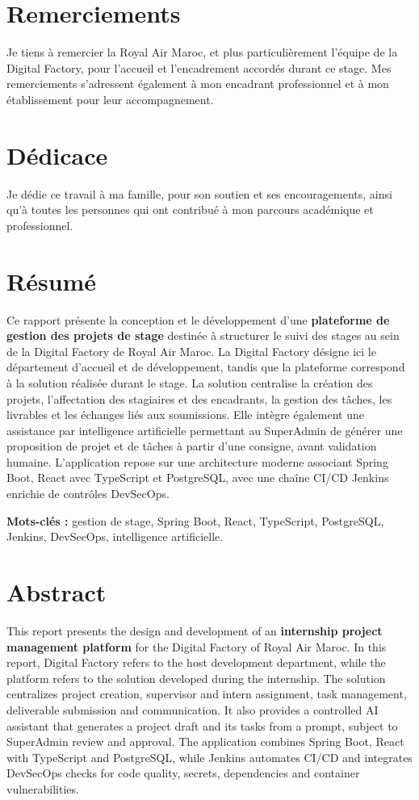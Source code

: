 \documentclass[11pt,a4paper,oneside]{report}
\begin{document}
\chapter*{Remerciements}
Je tiens à remercier la Royal Air Maroc, et plus particulièrement l'équipe de la Digital Factory, pour l'accueil et l'encadrement accordés durant ce stage. Mes remerciements s'adressent également à mon encadrant professionnel et à mon établissement pour leur accompagnement.

\chapter*{Dédicace}
Je dédie ce travail à ma famille, pour son soutien et ses encouragements, ainsi qu'à toutes les personnes qui ont contribué à mon parcours académique et professionnel.

\chapter*{Résumé}
Ce rapport présente la conception et le développement d'une \textbf{plateforme de gestion des projets de stage} destinée à structurer le suivi des stages au sein de la Digital Factory de Royal Air Maroc. La Digital Factory désigne ici le département d'accueil et de développement, tandis que la plateforme correspond à la solution réalisée durant le stage. La solution centralise la création des projets, l'affectation des stagiaires et des encadrants, la gestion des tâches, les livrables et les échanges liés aux soumissions. Elle intègre également une assistance par intelligence artificielle permettant au SuperAdmin de générer une proposition de projet et de tâches à partir d'une consigne, avant validation humaine. L'application repose sur une architecture moderne associant Spring Boot, React avec TypeScript et PostgreSQL, avec une chaîne CI/CD Jenkins enrichie de contrôles DevSecOps.

\noindent\textbf{Mots-clés :} gestion de stage, Spring Boot, React, TypeScript, PostgreSQL, Jenkins, DevSecOps, intelligence artificielle.

\chapter*{Abstract}
This report presents the design and development of an \textbf{internship project management platform} for the Digital Factory of Royal Air Maroc. In this report, Digital Factory refers to the host development department, while the platform refers to the solution developed during the internship. The solution centralizes project creation, supervisor and intern assignment, task management, deliverable submission and communication. It also provides a controlled AI assistant that generates a project draft and its tasks from a prompt, subject to SuperAdmin review and approval. The application combines Spring Boot, React with TypeScript and PostgreSQL, while Jenkins automates CI/CD and integrates DevSecOps checks for code quality, secrets, dependencies and container vulnerabilities.
\end{document}
